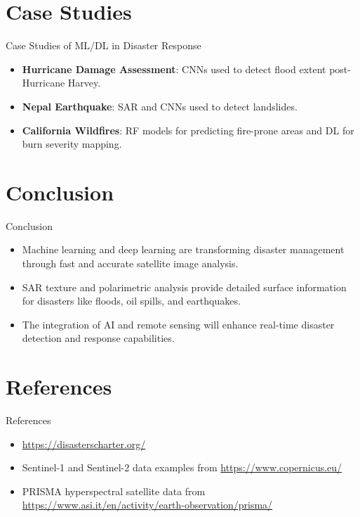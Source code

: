 \documentclass[10pt]{beamer}
\begin{document}
\section{Case Studies}
\begin{frame}{Case Studies of ML/DL in Disaster Response}
    \begin{itemize}
        \item \textbf{Hurricane Damage Assessment}: CNNs used to detect flood extent post-Hurricane Harvey.
        \item \textbf{Nepal Earthquake}: SAR and CNNs used to detect landslides.
        \item \textbf{California Wildfires}: RF models for predicting fire-prone areas and DL for burn severity mapping.
    \end{itemize}
\end{frame}

\section{Conclusion}
\begin{frame}{Conclusion}
    \begin{itemize}
        \item Machine learning and deep learning are transforming disaster management through fast and accurate satellite image analysis.
        \item SAR texture and polarimetric analysis provide detailed surface information for disasters like floods, oil spills, and earthquakes.
        \item The integration of AI and remote sensing will enhance real-time disaster detection and response capabilities.
    \end{itemize}
\end{frame}

\section{References}
\begin{frame}{References}
    \begin{itemize}
        \item \url{https://disasterscharter.org/}
        \item Sentinel-1 and Sentinel-2 data examples from \url{https://www.copernicus.eu/}
        \item PRISMA hyperspectral satellite data from \url{https://www.asi.it/en/activity/earth-observation/prisma/}
    \end{itemize}
\end{frame}
\end{document}
